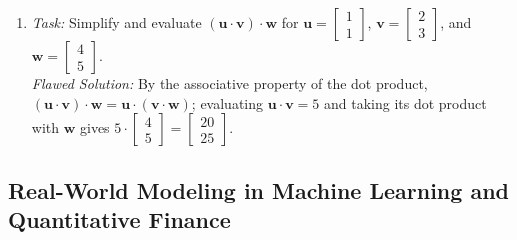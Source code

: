 \documentclass[11pt, letterpaper]{article}
\theoremstyle{definition}
\theoremstyle{remark}
\begin{document}
\begin{enumerate}[label=(\alph*)]
    \textit{Flawed Solution:} $\mathbf{u} \cdot \mathbf{v} = (1)(-4) + (2)(2) = 0$, so $\cos\theta = 0$, which yields $\theta = 0$ radians.
    \item \textit{Task:} Simplify and evaluate $(\mathbf{u} \cdot \mathbf{v}) \cdot \mathbf{w}$ for $\mathbf{u} = \begin{bmatrix} 1 \\ 1 \end{bmatrix}$, $\mathbf{v} = \begin{bmatrix} 2 \\ 3 \end{bmatrix}$, and $\mathbf{w} = \begin{bmatrix} 4 \\ 5 \end{bmatrix}$. \\
    \textit{Flawed Solution:} By the associative property of the dot product, $(\mathbf{u} \cdot \mathbf{v}) \cdot \mathbf{w} = \mathbf{u} \cdot (\mathbf{v} \cdot \mathbf{w})$; evaluating $\mathbf{u} \cdot \mathbf{v} = 5$ and taking its dot product with $\mathbf{w}$ gives $5 \cdot \begin{bmatrix} 4 \\ 5 \end{bmatrix} = \begin{bmatrix} 20 \\ 25 \end{bmatrix}$.
\end{enumerate}

\subsection{Real-World Modeling in Machine Learning and Quantitative Finance}
\end{document}
